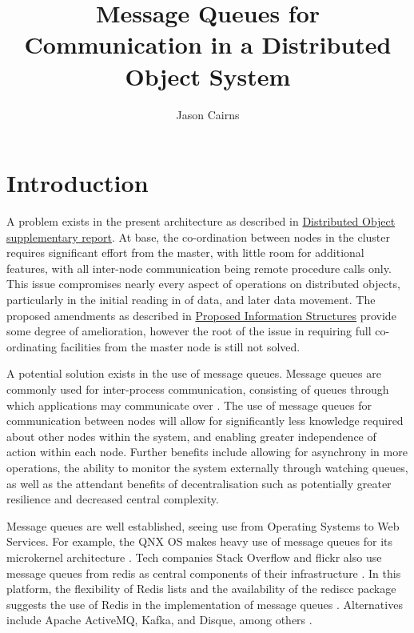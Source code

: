 \documentclass[a4paper,10pt]{article}
\begin{document}
\title{Message Queues for Communication in a Distributed Object System}
\author{Jason Cairns}
  
\maketitle{}

\section{Introduction}
A problem exists in the present architecture as described in
\href{experiment-eager-dist-obj-supp.pdf}{Distributed Object supplementary
report}.
At base, the co-ordination between nodes in the cluster requires significant
effort from the master, with little room for additional features, with all
inter-node communication being remote procedure calls only.
This issue compromises nearly every aspect of operations on distributed
objects, particularly in the initial reading in of data, and later data
movement.
The proposed amendments as described in
\href{current-proposed-info-structures.pdf}{Proposed Information Structures}
provide some degree of amelioration, however the root of the issue in requiring
full co-ordinating facilities from the master node is still not solved.

A potential solution exists in the use of message queues.
Message queues are commonly used for inter-process communication, consisting of
queues through which applications may communicate over \cite{curry2004message}.
The use of message queues for communication between nodes will allow for
significantly less knowledge required about other nodes within the system, and
enabling greater independence of action within each node.
Further benefits include allowing for asynchrony in more operations, the
ability to monitor the system externally through watching queues, as well as
the attendant benefits of decentralisation such as potentially greater
resilience and decreased central complexity.

Message queues are well established, seeing use from Operating Systems to Web
Services.
For example, the QNX OS makes heavy use of message queues for its microkernel
architecture \cite{hildebrand1992qnx}.
Tech companies Stack Overflow and flickr also use message queues from redis as
central components of their infrastructure
\cite{nolan2011flickr}\cite{montrose2016stack}.
In this platform, the flexibility of Redis lists and the availability of the
rediscc package suggests the use of Redis in the implementation of message
queues \cite{sanfilippo2009redis}\cite{urbanek2020rediscc}. 
Alternatives include Apache ActiveMQ, Kafka, and Disque, among others
\cite{snyder2011activemq}\cite{garg2013kafka}\cite{sanfilippo2016disque}.
\end{document}
